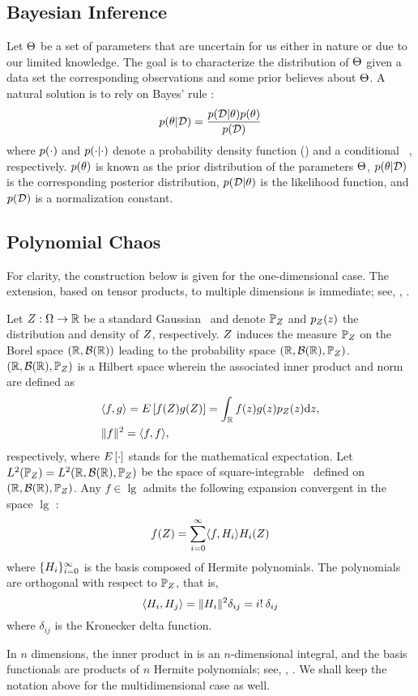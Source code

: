 \subsection{Bayesian Inference}
Let $\Theta$ be a set of parameters that are uncertain for us either in nature or due to our limited knowledge. The goal is to characterize the distribution of $\Theta$ given a data set the corresponding observations and some prior believes about $\Theta$. A natural solution is to rely on Bayes' rule \cite{gelman2004}:
\begin{equation} \elabel{bayes}
  \f{\u | \data} = \frac{\f{\data | \u} \f{\u}}{\f{\data}}
\end{equation}
where $\f{\cdot}$ and $\f{\cdot | \cdot}$ denote a probability density function (\pdf) and a conditional \pdf\ \cite{durrett2010}, respectively. $\f{\u}$ is known as the prior distribution of the parameters $\Theta$, $\f{\u | \data}$ is the corresponding posterior distribution, $\f{\data | \u}$ is the likelihood function, and $\f{\data}$ is a normalization constant.

\subsection{Polynomial Chaos}
For clarity, the construction below is given for the one-dimensional case. The extension, based on tensor products, to multiple dimensions is immediate; see, \eg, \cite{maitre2010}.

Let $Z: \Omega \to \mathbb{R}$ be a standard Gaussian \rv\ and denote $\mathbb{P}_Z$ and $\f{\Z}{\z}$ the distribution and density of $Z$, respectively. $Z$ induces the measure $\mathbb{P}_Z$ on the Borel space $(\mathbb{R}, \mathcal{B}(\mathbb{R}))$ leading to the probability space $(\mathbb{R}, \mathcal{B}(\mathbb{R}), \mathbb{P}_Z)$. $(\mathbb{R}, \mathcal{B}(\mathbb{R}), \mathbb{P}_Z)$ is a Hilbert space wherein the associated inner product and norm are defined as
\begin{align}
  & \iprod{f}{g} = \E{f(\Z) g(\Z)} = \int_\real f(\z) g(\z) \f{\Z}{\z} \d\z, \elabel{inner-product} \\
  & \norm{f}^2 = \iprod{f, f} \nonumber,
\end{align}
respectively, where $\E{\cdot}$ stands for the mathematical expectation. Let $L^{2}(\mathbb{P}_Z) = L^{2}(\mathbb{R}, \mathcal{B}(\mathbb{R}), \mathbb{P}_Z)$ be the space of square-integrable \rvs\ defined on $(\mathbb{R}, \mathcal{B}(\mathbb{R}), \mathbb{P}_Z)$. Any $f \in \lg$ admits the following expansion convergent in the space $\lg$ \cite{maitre2010}:
\[
  f(\Z) = \sum_{i = 0}^\infty \iprod{f}{\pcb_i} \pcb_i(\Z)
\]
where $\{ H_i \}_{i = 0}^\infty$ is the basis composed of Hermite polynomials. The polynomials are orthogonal with respect to $\mathbb{P}_Z$, that is,
\[
  \iprod{\pcb_i}{\pcb_j} = \norm{\pcb_i}^2 \delta_{ij} = i! \: \delta_{ij}
\]
where $\delta_{ij}$ is the Kronecker delta function.

In $n$ dimensions, the inner product in  is an $n$-dimensional integral, and the basis functionals are products of $n$ Hermite polynomials; see, \eg, \cite{maitre2010}. We shall keep the notation above for the multidimensional case as well.
